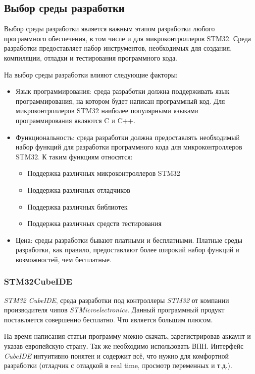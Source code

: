 \subsection{Выбор среды разработки}

Выбор среды разработки является важным этапом разработки любого программного обеспечения, в том числе и для микроконтроллеров STM32. Среда разработки предоставляет набор инструментов, необходимых для создания, компиляции, отладки и тестирования программного кода.

На выбор среды разработки влияют следующие факторы:
\begin{itemize}
    \item Язык программирования: среда разработки должна поддерживать язык программирования, на котором будет написан программный код. Для микроконтроллеров STM32 наиболее популярными языками программирования являются C и C++.
    \item Функциональность: среда разработки должна предоставлять необходимый набор функций для разработки программного кода для микроконтроллеров STM32. К таким функциям относятся:
    \begin{itemize}
        \item Поддержка различных микроконтроллеров STM32
        \item Поддержка различных отладчиков
        \item Поддержка различных библиотек
        \item Поддержка различных средств тестирования
    \end{itemize}
    \item Цена: среды разработки бывают платными и бесплатными. Платные среды разработки, как правило, предоставляют более широкий набор функций и возможностей, чем бесплатные.
\end{itemize}

\subsubsection{STM32CubeIDE}
\textit{STM32 CubeIDE}, среда разработки под контроллеры \textit{STM32} от компании производителя чипов \textit{STMicroelectronics}. Данный программный продукт поставляется совершенно бесплатно. Что является большим плюсом.

На время написания статьи программу можно скачать, зарегистрировав аккаунт и указав европейскую страну. Так же необходимо использовать ВПН. Интерфейс \textit{CubeIDE} интуитивно понятен и содержит всё, что нужно для комфортной разработки (отладчик с отладкой в real time, просмотр переменных и т.д.).

